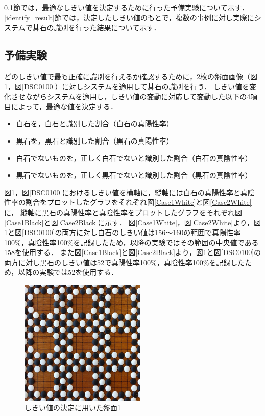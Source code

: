 \documentclass[openright]{nitocs}
\numberwithin{equation}{section}
\begin{document}
        \ref{threshold}節では，最適なしきい値を決定するために行った予備実験について示す．
        \ref{identify_result}節では，決定したしきい値のもとで，複数の事例に対し実際にシステムで碁石の識別を行った結果について示す．

        \subsection{予備実験} \label{threshold}
            どのしきい値で最も正確に識別を行えるか確認するために，2枚の盤面画像（図\ref{DSC0087}，図\ref{DSC0100}）に対しシステムを適用して碁石の識別を行う．
            しきい値を変化させながらシステムを適用し，しきい値の変動に対応して変動した以下の4項目によって，最適な値を決定する．
            \begin{itemize}
                \item 白石を，白石と識別した割合（白石の真陽性率）
                \item 黒石を，黒石と識別した割合（黒石の真陽性率）
                \item 白石でないものを，正しく白石でないと識別した割合（白石の真陰性率）
                \item 黒石でないものを，正しく黒石でないと識別した割合（黒石の真陰性率）
            \end{itemize}

            図\ref{DSC0087}，図\ref{DSC0100}におけるしきい値を横軸に，縦軸には白石の真陽性率と真陰性率の割合をプロットしたグラフをそれぞれ図\ref{Case1White}と図\ref{Case2White}に，
            縦軸に黒石の真陽性率と真陰性率をプロットしたグラフをそれぞれ図\ref{Case1Black}と図\ref{Case2Black}に示す．
            図\ref{Case1White}，図\ref{Case2White}より，図\ref{DSC0087}と図\ref{DSC0100}の両方に対し白石のしきい値は156～160の範囲で真陽性率100\%，真陰性率100\%を記録したため，以降の実験ではその範囲の中央値である158を使用する．
            また図\ref{Case1Black}と図\ref{Case2Black}より，図\ref{DSC0087}と図\ref{DSC0100}の両方に対し黒石のしきい値は52で真陽性率100\%，真陰性率100\%を記録したため，以降の実験では52を使用する．

            \begin{figure}[tb] %
                \begin{center}
                \includegraphics[clip,width=60mm]{DSC_0087/boardImg.jpg} 
                \caption{しきい値の決定に用いた盤面1}
                \label{DSC0087}
                \end{center}
            \end{figure}
\end{document}
